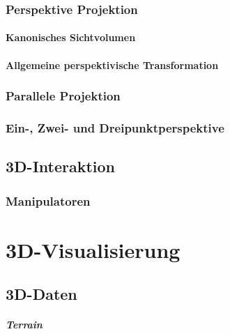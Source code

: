 \documentclass[a4paper, 11pt, accentcolor = tud3b]{tudreport}
\begin{document}
			\subsection{Perspektive Projektion} %

				\subsubsection{Kanonisches Sichtvolumen} %

				\subsubsection{Allgemeine perspektivische Transformation} %

			\subsection{Parallele Projektion} %

			\subsection{Ein-, Zwei- und Dreipunktperspektive} %

		\section{3D-Interaktion} %

			\subsection{Manipulatoren} %

	\chapter{3D-Visualisierung} %

		\section{3D-Daten} %

			\paragraph{Terrain} %
\end{document}
